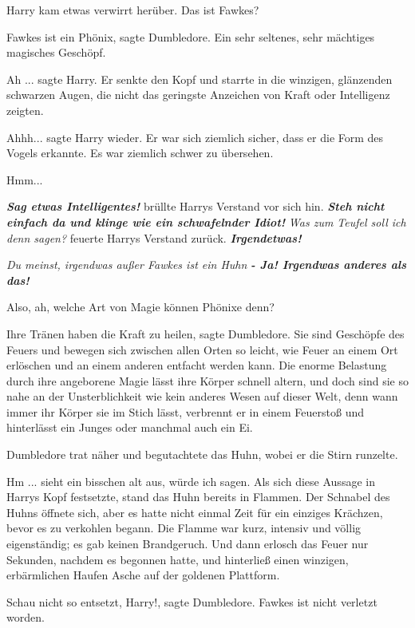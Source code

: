 Harry kam etwas verwirrt herüber. \glqq Das ist Fawkes?\grqq{}

\glqq Fawkes ist ein Phönix\grqq{}, sagte Dumbledore. \glqq Ein sehr seltenes,
sehr mächtiges magisches Geschöpf.\grqq{}

\glqq Ah ...\grqq{} sagte Harry. Er senkte den Kopf und starrte in die winzigen,
glänzenden schwarzen Augen, die nicht das geringste Anzeichen von Kraft oder
Intelligenz zeigten.

\glqq Ahhh...\grqq{} sagte Harry wieder. Er war sich ziemlich sicher, dass er
die Form des Vogels erkannte. Es war ziemlich schwer zu übersehen.

\glqq Hmm...\grqq{}

\textbf{\emph{Sag etwas Intelligentes!}} brüllte Harrys Verstand vor sich hin.
\textbf{\emph{Steh nicht einfach da und klinge wie ein schwafelnder Idiot! }}
\emph{Was zum Teufel soll ich denn sagen? }feuerte Harrys Verstand zurück.
\textbf{\emph{Irgendetwas!}}

\emph{Du meinst, irgendwas außer \glqq Fawkes ist ein Huhn\grqq{}}
\textbf{\emph{- Ja! Irgendwas anderes als das!}}

\glqq Also, ah, welche Art von Magie können Phönixe denn?\grqq{}

\glqq Ihre Tränen haben die Kraft zu heilen\grqq{}, sagte Dumbledore. \glqq Sie
sind Geschöpfe des Feuers und bewegen sich zwischen allen Orten so leicht, wie
Feuer an einem Ort erlöschen und an einem anderen entfacht werden kann. Die
enorme Belastung durch ihre angeborene Magie lässt ihre Körper schnell altern,
und doch sind sie so nahe an der Unsterblichkeit wie kein anderes Wesen auf
dieser Welt, denn wann immer ihr Körper sie im Stich lässt, verbrennt er in
einem Feuerstoß und hinterlässt ein Junges oder manchmal auch ein Ei.\grqq{}

Dumbledore trat näher und begutachtete das Huhn, wobei er die Stirn runzelte.

\glqq Hm ... sieht ein bisschen alt aus, würde ich sagen.\grqq{} Als sich diese
Aussage in Harrys Kopf festsetzte, stand das Huhn bereits in Flammen. Der
Schnabel des Huhns öffnete sich, aber es hatte nicht einmal Zeit für ein
einziges Krächzen, bevor es zu verkohlen begann. Die Flamme war kurz, intensiv
und völlig eigenständig; es gab keinen Brandgeruch. Und dann erlosch das Feuer
nur Sekunden, nachdem es begonnen hatte, und hinterließ einen winzigen,
erbärmlichen Haufen Asche auf der goldenen Plattform.

\glqq Schau nicht so entsetzt, Harry!\grqq{}, sagte Dumbledore. \glqq Fawkes ist
nicht verletzt worden.\grqq{}

